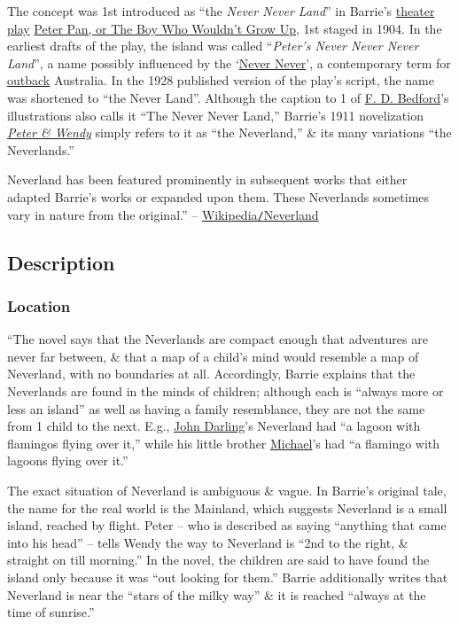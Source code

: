 \documentclass[oneside]{book}
\numberwithin{equation}{section}
\begin{document}
The concept was 1st introduced as ``the \textit{Never Never Land}'' in Barrie's \href{https://en.wikipedia.org/wiki/Theatre\_play}{theater play} \href{https://en.wikipedia.org/wiki/Peter_Pan,_or_The_Boy_Who_Wouldn%27t_Grow_Up}{Peter Pan, or The Boy Who Wouldn't Grow Up}, 1st staged in 1904. In the earliest drafts of the play, the island was called ``\textit{Peter's Never Never Never Land}'', a name possibly influenced by the `\href{https://en.wikipedia.org/wiki/Never_Never_(Australian_outback)}{Never Never}', a contemporary term for \href{https://en.wikipedia.org/wiki/Outback}{outback} Australia. In the 1928 published version of the play's script, the name was shortened to ``the Never Land''. Although the caption to 1 of \href{https://en.wikipedia.org/wiki/Francis_Donkin_Bedford}{F. D. Bedford}'s illustrations also calls it ``The Never Never Land,'' Barrie's 1911 novelization \href{https://en.wikipedia.org/wiki/Peter_and_Wendy}{\textit{Peter \& Wendy}} simply refers to it as ``the Neverland,'' \& its many variations ``the Neverlands.''

Neverland has been featured prominently in subsequent works that either adapted Barrie's works or expanded upon them. These Neverlands sometimes vary in nature from the original.'' -- \href{https://en.wikipedia.org/wiki/Neverland}{Wikipedia\texttt{/}Neverland}

\subsection{Description}

\subsubsection{Location}
``The novel says that the Neverlands are compact enough that adventures are never far between, \& that a map of a child's mind would resemble a map of Neverland, with no boundaries at all. Accordingly, Barrie explains that the Neverlands are found in the minds of children; although each is ``always more or less an island'' as well as having a family resemblance, they are not the same from 1 child to the next. E.g., \href{https://en.wikipedia.org/wiki/John_Darling_(Peter_Pan)}{John Darling}'s Neverland had ``a lagoon with flamingos flying over it,'' while his little brother \href{https://en.wikipedia.org/wiki/Michael_Darling_(Peter_Pan)}{Michael}'s had ``a flamingo with lagoons flying over it.''

The exact situation of Neverland is ambiguous \& vague. In Barrie's original tale, the name for the real world is the Mainland, which suggests Neverland is a small island, reached by flight. Peter -- who is described as saying ``anything that came into his head'' -- tells Wendy the way to Neverland is ``2nd to the right, \& straight on till morning.'' In the novel, the children are said to have found the island only because it was ``out looking for them.'' Barrie additionally writes that Neverland is near the ``stars of the milky way'' \& it is reached ``always at the time of sunrise.''
\end{document}
